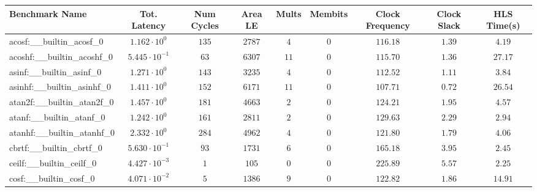 \begin{tabular}{|l|c|c|c|c|c|c|c|c|}
\hline
Benchmark Name                            & Tot. Latency            & Num Cycles & Area LE    & Mults   & Membits & Clock Frequency & Clock Slack & HLS Time(s) \\
\hline
acosf:\_\_builtin\_acosf\_0               & $ 1.162 \cdot 10^{0}  $ & $ 135    $ & $ 2787   $ & $ 4   $ & $ 0   $ & $ 116.18      $ & $ 1.39    $ & $ 4.19    $ \\
acoshf:\_\_builtin\_acoshf\_0             & $ 5.445 \cdot 10^{-1} $ & $ 63     $ & $ 6307   $ & $ 11  $ & $ 0   $ & $ 115.70      $ & $ 1.36    $ & $ 27.17   $ \\
asinf:\_\_builtin\_asinf\_0               & $ 1.271 \cdot 10^{0}  $ & $ 143    $ & $ 3235   $ & $ 4   $ & $ 0   $ & $ 112.52      $ & $ 1.11    $ & $ 3.84    $ \\
asinhf:\_\_builtin\_asinhf\_0             & $ 1.411 \cdot 10^{0}  $ & $ 152    $ & $ 6171   $ & $ 11  $ & $ 0   $ & $ 107.71      $ & $ 0.72    $ & $ 26.54   $ \\
atan2f:\_\_builtin\_atan2f\_0             & $ 1.457 \cdot 10^{0}  $ & $ 181    $ & $ 4663   $ & $ 2   $ & $ 0   $ & $ 124.21      $ & $ 1.95    $ & $ 4.57    $ \\
atanf:\_\_builtin\_atanf\_0               & $ 1.242 \cdot 10^{0}  $ & $ 161    $ & $ 2811   $ & $ 2   $ & $ 0   $ & $ 129.63      $ & $ 2.29    $ & $ 2.94    $ \\
atanhf:\_\_builtin\_atanhf\_0             & $ 2.332 \cdot 10^{0}  $ & $ 284    $ & $ 4962   $ & $ 4   $ & $ 0   $ & $ 121.80      $ & $ 1.79    $ & $ 4.06    $ \\
cbrtf:\_\_builtin\_cbrtf\_0               & $ 5.630 \cdot 10^{-1} $ & $ 93     $ & $ 1731   $ & $ 6   $ & $ 0   $ & $ 165.18      $ & $ 3.95    $ & $ 2.45    $ \\
ceilf:\_\_builtin\_ceilf\_0               & $ 4.427 \cdot 10^{-3} $ & $ 1      $ & $ 105    $ & $ 0   $ & $ 0   $ & $ 225.89      $ & $ 5.57    $ & $ 2.25    $ \\
cosf:\_\_builtin\_cosf\_0                 & $ 4.071 \cdot 10^{-2} $ & $ 5      $ & $ 1386   $ & $ 9   $ & $ 0   $ & $ 122.82      $ & $ 1.86    $ & $ 14.91   $ \\

\end{tabular}
